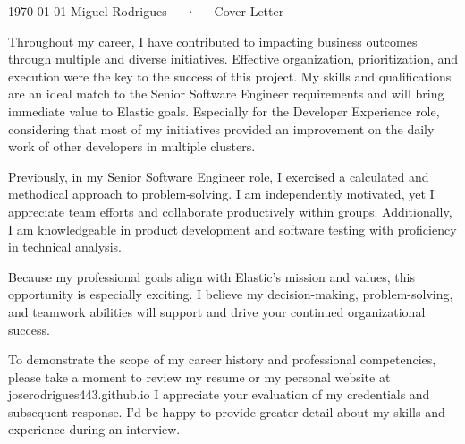 \documentclass[11pt, a4paper]{awesome-cv}
\begin{document}
\makecvheader[R]

\makecvfooter
  {\today}
  {Miguel Rodrigues~~~·~~~Cover Letter}
  {}

\makelettertitle

\begin{cvletter}


  Throughout my career, I have contributed to impacting business outcomes through multiple and diverse initiatives.
  Effective organization, prioritization, and execution were the key to the success of this project.
  My skills and qualifications are an ideal match to the Senior Software Engineer requirements and will bring immediate value to Elastic goals.
  Especially for the Developer Experience role, considering that most of my initiatives provided an improvement on the daily work of other developers in multiple clusters.


  Previously, in my Senior Software Engineer role, I exercised a calculated and methodical approach to problem-solving.
  I am independently motivated, yet I appreciate team efforts and collaborate productively within groups. Additionally, I am knowledgeable in product development and software testing with proficiency in technical analysis.


  Because my professional goals align with Elastic's mission and values, this opportunity is especially exciting. I believe my decision-making, problem-solving, and teamwork abilities will support and drive your continued organizational success.

  To demonstrate the scope of my career history and professional competencies, please take a moment to review my resume or my personal website at joserodrigues443.github.io
  I appreciate your evaluation of my credentials and subsequent response.
  I'd be happy to provide greater detail about my skills and experience during an interview. 



\end{cvletter}
\end{document}
